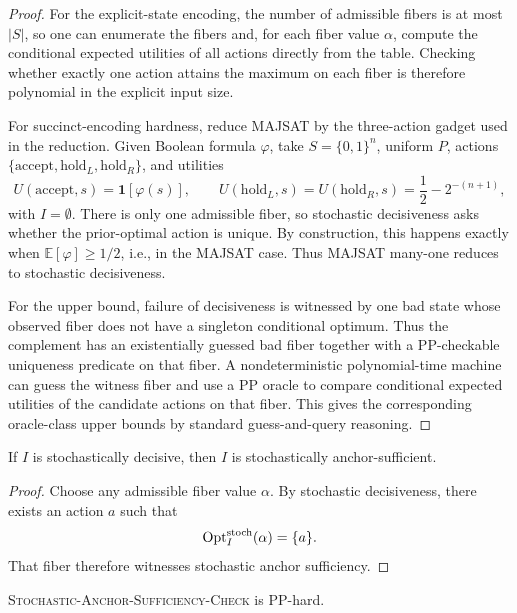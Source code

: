 \begin{proof}
For the explicit-state encoding, the number of admissible fibers is at most $|S|$, so one can enumerate the fibers and, for each fiber value $\alpha$, compute the conditional expected utilities of all actions directly from the table. Checking whether exactly one action attains the maximum on each fiber is therefore polynomial in the explicit input size.

For succinct-encoding hardness, reduce MAJSAT by the three-action gadget used in the reduction. Given Boolean formula $\varphi$, take $S=\{0,1\}^n$, uniform $P$, actions $\{\mathrm{accept},\mathrm{hold}_L,\mathrm{hold}_R\}$, and utilities
\[
U(\mathrm{accept},s)=\mathbf{1}[\varphi(s)],\qquad
U(\mathrm{hold}_L,s)=U(\mathrm{hold}_R,s)=\frac12-2^{-(n+1)},
\]
with $I=\emptyset$. There is only one admissible fiber, so stochastic decisiveness asks whether the prior-optimal action is unique. By construction, this happens exactly when $\mathbb{E}[\varphi]\ge 1/2$, i.e., in the MAJSAT case. Thus MAJSAT many-one reduces to stochastic decisiveness.

For the upper bound, failure of decisiveness is witnessed by one bad state whose observed fiber does not have a singleton conditional optimum. Thus the complement has an existentially guessed bad fiber together with a PP-checkable uniqueness predicate on that fiber. A nondeterministic polynomial-time machine can guess the witness fiber and use a PP oracle to compare conditional expected utilities of the candidate actions on that fiber. This gives the corresponding oracle-class upper bounds by standard guess-and-query reasoning. 
\end{proof}

\begin{proposition}\label{prop:stochastic-anchor-refinement}
If $I$ is stochastically decisive, then $I$ is stochastically anchor-sufficient.
\end{proposition}


\begin{proof}
Choose any admissible fiber value $\alpha$. By stochastic decisiveness, there exists an action $a$ such that
\[
\mathrm{Opt}^{\mathrm{stoch}}_I(\alpha)=\{a\}.
\]
That fiber therefore witnesses stochastic anchor sufficiency.
\end{proof}

\begin{theorem}\label{thm:stochastic-anchor-hard}
\textsc{Stochastic-Anchor-Sufficiency-Check} is PP-hard.
\end{theorem}


